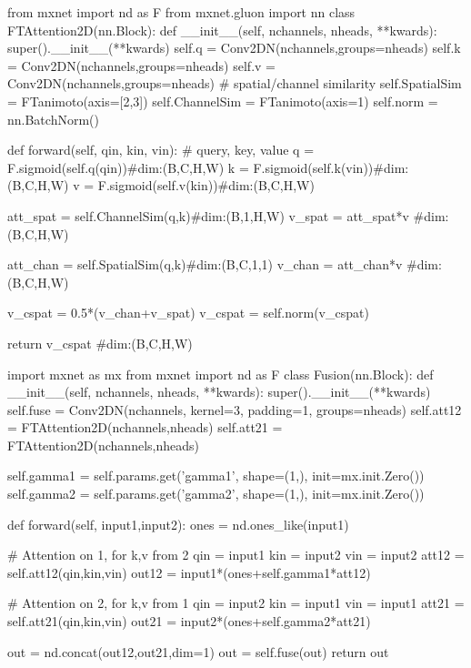 \documentclass[times, 5p]{elsarticle}
\begin{document}
\begin{python}[caption={\textsc{mxnet/gluon} style pseudocode for the fractal Tanimoto Attention module},
emph={FTAttention2D,forward,__init__,inner_prod},emphstyle=\textcolor{magenta},label={FTAttentionCODE}]
from mxnet import nd as F
from mxnet.gluon import nn
class FTAttention2D(nn.Block):
    def __init__(self, nchannels, nheads, **kwards):
            super().__init__(**kwards)
        self.q = Conv2DN(nchannels,groups=nheads)
        self.k = Conv2DN(nchannels,groups=nheads)
        self.v = Conv2DN(nchannels,groups=nheads)
        # spatial/channel similarity
        self.SpatialSim = FTanimoto(axis=[2,3])
        self.ChannelSim = FTanimoto(axis=1)
        self.norm = nn.BatchNorm()

    def forward(self, qin, kin, vin):
        # query, key, value
        q = F.sigmoid(self.q(qin))#dim:(B,C,H,W)
        k = F.sigmoid(self.k(vin))#dim:(B,C,H,W) 
        v = F.sigmoid(self.v(kin))#dim:(B,C,H,W)

        att_spat = self.ChannelSim(q,k)#dim:(B,1,H,W)
        v_spat  =  att_spat*v #dim:(B,C,H,W)

        att_chan = self.SpatialSim(q,k)#dim:(B,C,1,1)
        v_chan   = att_chan*v #dim:(B,C,H,W)

        v_cspat =  0.5*(v_chan+v_spat) 
        v_cspat = self.norm(v_cspat)

        return v_cspat #dim:(B,C,H,W) 
\end{python}




\begin{python}[caption={\textsc{mxnet/gluon} style pseudocode for the Relative Attention Fusion module},
emph={Fusion,forward,__init__},emphstyle=\textcolor{magenta},label={FusionCODE}]
import mxnet as mx
from mxnet import nd as F
class Fusion(nn.Block):
    def __init__(self, nchannels, nheads, **kwards):
        super().__init__(**kwards)
        self.fuse = Conv2DN(nchannels,
                          kernel=3,
                          padding=1,
                          groups=nheads)
        self.att12 = FTAttention2D(nchannels,nheads)
        self.att21 = FTAttention2D(nchannels,nheads)

        self.gamma1  = self.params.get('gamma1',
                      shape=(1,),
                      init=mx.init.Zero())
        self.gamma2  = self.params.get('gamma2',
                      shape=(1,),
                      init=mx.init.Zero())

    def forward(self, input1,input2):
        ones = nd.ones_like(input1)          
    
        # Attention on 1, for k,v from 2        
        qin = input1
        kin = input2
        vin = input2
        att12 = self.att12(qin,kin,vin)
        out12 = input1*(ones+self.gamma1*att12)
        
        # Attention on 2, for k,v from 1
        qin = input2
        kin = input1
        vin = input1
        att21 = self.att21(qin,kin,vin)
    	out21 = input2*(ones+self.gamma2*att21)

    	out = nd.concat(out12,out21,dim=1)
    	out = self.fuse(out)    	    
        return out
\end{python}
\end{document}
